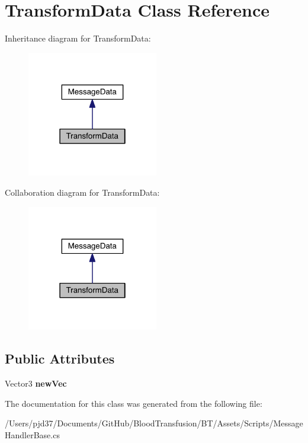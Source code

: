 \hypertarget{class_transform_data}{}\section{Transform\+Data Class Reference}
\label{class_transform_data}


Inheritance diagram for Transform\+Data\+:\nopagebreak
\begin{figure}[H]
\begin{center}
\leavevmode
\includegraphics[width=162pt]{class_transform_data__inherit__graph}
\end{center}
\end{figure}


Collaboration diagram for Transform\+Data\+:\nopagebreak
\begin{figure}[H]
\begin{center}
\leavevmode
\includegraphics[width=162pt]{class_transform_data__coll__graph}
\end{center}
\end{figure}
\subsection*{Public Attributes}
\begin{DoxyCompactItemize}
\item 
Vector3 {\bfseries new\+Vec}\hypertarget{class_transform_data_a9945a7c55608ff73be5a7bb4bda240f0}{}\label{class_transform_data_a9945a7c55608ff73be5a7bb4bda240f0}

\end{DoxyCompactItemize}


The documentation for this class was generated from the following file\+:\begin{DoxyCompactItemize}
\item 
/\+Users/pjd37/\+Documents/\+Git\+Hub/\+Blood\+Transfusion/\+B\+T/\+Assets/\+Scripts/Message\+Handler\+Base.\+cs\end{DoxyCompactItemize}

